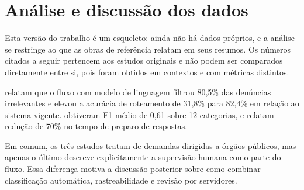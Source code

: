 
\section{Análise e discussão dos dados}

Esta versão do trabalho é um esqueleto: ainda não há dados próprios, e a análise se restringe ao que as obras de referência relatam em seus resumos. Os números citados a seguir pertencem aos estudos originais e não podem ser comparados diretamente entre si, pois foram obtidos em contextos e com métricas distintos.

 relatam que o fluxo com modelo de linguagem filtrou 80,5\% das denúncias irrelevantes e elevou a acurácia de roteamento de 31,8\% para 82,4\% em relação ao sistema vigente.  obtiveram F1 médio de 0,61 sobre 12 categorias, e  relatam redução de 70\% no tempo de preparo de respostas.

Em comum, os três estudos tratam de demandas dirigidas a órgãos públicos, mas apenas o último descreve explicitamente a supervisão humana como parte do fluxo. Essa diferença motiva a discussão posterior sobre como combinar classificação automática, rastreabilidade e revisão por servidores.
